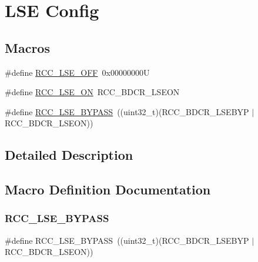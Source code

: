 \hypertarget{group___r_c_c___l_s_e___config}{}\section{L\+SE Config}
\label{group___r_c_c___l_s_e___config}
\subsection*{Macros}
\begin{DoxyCompactItemize}
\item 
\#define \hyperlink{group___r_c_c___l_s_e___config_ga6645c27708d0cad1a4ab61d2abb24c77}{R\+C\+C\+\_\+\+L\+S\+E\+\_\+\+O\+FF}~0x00000000U
\item 
\#define \hyperlink{group___r_c_c___l_s_e___config_gac981ea636c2f215e4473901e0912f55a}{R\+C\+C\+\_\+\+L\+S\+E\+\_\+\+ON}~R\+C\+C\+\_\+\+B\+D\+C\+R\+\_\+\+L\+S\+E\+ON
\item 
\#define \hyperlink{group___r_c_c___l_s_e___config_gaad580157edbae878edbcc83c5a68e767}{R\+C\+C\+\_\+\+L\+S\+E\+\_\+\+B\+Y\+P\+A\+SS}~((uint32\+\_\+t)(R\+C\+C\+\_\+\+B\+D\+C\+R\+\_\+\+L\+S\+E\+B\+YP $\vert$ R\+C\+C\+\_\+\+B\+D\+C\+R\+\_\+\+L\+S\+E\+ON))
\end{DoxyCompactItemize}


\subsection{Detailed Description}


\subsection{Macro Definition Documentation}
\mbox{\label{group___r_c_c___l_s_e___config_gaad580157edbae878edbcc83c5a68e767}} 
\subsubsection{\texorpdfstring{R\+C\+C\+\_\+\+L\+S\+E\+\_\+\+B\+Y\+P\+A\+SS}{RCC\_LSE\_BYPASS}}
{\footnotesize\ttfamily \#define R\+C\+C\+\_\+\+L\+S\+E\+\_\+\+B\+Y\+P\+A\+SS~((uint32\+\_\+t)(R\+C\+C\+\_\+\+B\+D\+C\+R\+\_\+\+L\+S\+E\+B\+YP $\vert$ R\+C\+C\+\_\+\+B\+D\+C\+R\+\_\+\+L\+S\+E\+ON))}

